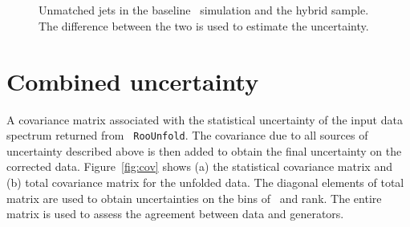 \begin{figure}
~
~
\\
~
~
~
\caption{Unmatched jets in the baseline \ttbar\ simulation and the hybrid sample. The difference between the two is used to estimate the uncertainty.}
\label{fig:FalseComp}
\end{figure}

\section{Combined uncertainty}
A covariance matrix associated with the statistical uncertainty of the input data spectrum returned from \texttt{ RooUnfold}. The covariance due to all sources of uncertainty described above is then added to obtain the final uncertainty on the corrected data. Figure~\ref{fig:cov}  shows (a) the statistical covariance matrix  and (b) total covariance matrix for the unfolded data. The diagonal elements of total matrix are used to obtain uncertainties on the bins of \pt\ and rank. The entire matrix is used to assess the \chisq agreement between data and generators. 

